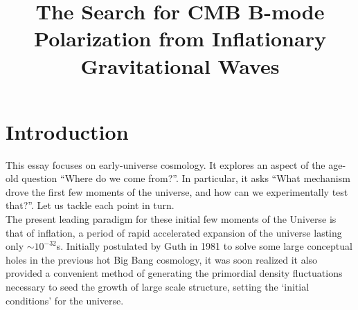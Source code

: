 \documentclass[a4paper,10pt]{article}
\title{ The Search for CMB B-mode Polarization from Inflationary Gravitational Waves}
\begin{document}

\maketitle





\section{Introduction}


This essay focuses on early-universe cosmology. It explores an aspect of the age-old question ``Where do we come from?''. In particular, it asks ``What mechanism drove the first few moments of the universe, and how can we experimentally test that?''. Let us tackle each point in turn.\\

The present leading paradigm for these initial few moments of the Universe is that of inflation, a period of rapid accelerated expansion of the universe lasting only $\sim10^{-32}$s. Initially postulated by Guth in 1981 \cite{Guth} to solve some large conceptual holes in the previous hot Big Bang cosmology, it was soon realized it also provided a convenient method of generating the primordial density fluctuations necessary to seed the growth of large scale structure, setting the `initial conditions' for the universe. \\
\end{document}
